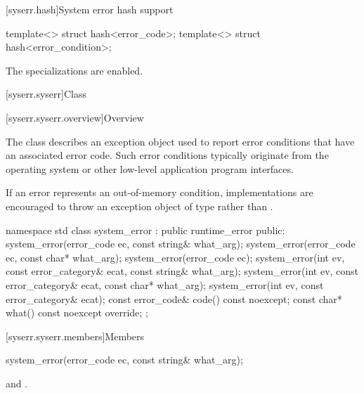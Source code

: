 [syserr.hash]{System error hash support}

%
\begin{itemdecl}
template<> struct hash<error_code>;
template<> struct hash<error_condition>;
\end{itemdecl}

\begin{itemdescr}
\pnum
The specializations are enabled.
\end{itemdescr}

[syserr.syserr]{Class }

[syserr.syserr.overview]{Overview}

\pnum
The class  describes an exception object used to
report error conditions that have an associated error code. Such error
conditions typically originate from the operating system or other low-level
application program interfaces.

\pnum
\begin{note}
If an error represents an out-of-memory condition, implementations are
encouraged to throw an exception object of type  rather
than .
\end{note}
%
\begin{codeblock}
namespace std {
  class system_error : public runtime_error {
  public:
    system_error(error_code ec, const string& what_arg);
    system_error(error_code ec, const char* what_arg);
    system_error(error_code ec);
    system_error(int ev, const error_category& ecat, const string& what_arg);
    system_error(int ev, const error_category& ecat, const char* what_arg);
    system_error(int ev, const error_category& ecat);
    const error_code& code() const noexcept;
    const char* what() const noexcept override;
  };
}
\end{codeblock}

[syserr.syserr.members]{Members}

%
\begin{itemdecl}
system_error(error_code ec, const string& what_arg);
\end{itemdecl}

\begin{itemdescr}
\pnum
\ensures
{} and\newline
{}.
\end{itemdescr}

